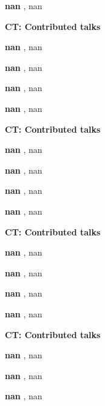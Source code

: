 \documentclass[ILAS2025-program.tex]{subfiles}
\begin{document}
\begin{description}
\begin{description}
        \item[] \textbf{nan} , nan
        \end{description}
    \begin{description}
    \item[] {\color{mstitle}\textbf{CT: Contributed talks}} 
    \item[] \textbf{nan} , nan
        \item[] \textbf{nan} , nan
        \item[] \textbf{nan} , nan
        \item[] \textbf{nan} , nan
        \end{description}
    \begin{description}
    \item[] {\color{mstitle}\textbf{CT: Contributed talks}} 
    \item[] \textbf{nan} , nan
        \item[] \textbf{nan} , nan
        \item[] \textbf{nan} , nan
        \item[] \textbf{nan} , nan
        \end{description}
    \begin{description}
    \item[] {\color{mstitle}\textbf{CT: Contributed talks}} 
    \item[] \textbf{nan} , nan
        \item[] \textbf{nan} , nan
        \item[] \textbf{nan} , nan
        \item[] \textbf{nan} , nan
        \end{description}
    \begin{description}
    \item[] {\color{mstitle}\textbf{CT: Contributed talks}} 
    \item[] \textbf{nan} , nan
        \item[] \textbf{nan} , nan
        \item[] \textbf{nan} , nan

\end{description}
\end{description}
\end{document}
